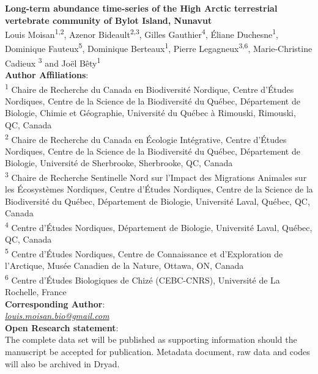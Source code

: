 \documentclass[a4paper,twoside,12pt]{article}
\begin{document}
 
\begingroup  
  \centering
\textbf{Long-term abundance time-series of the High Arctic terrestrial vertebrate community of Bylot Island, Nunavut}\\[1.5em]
 Louis Moisan\textsuperscript{1,2}, Azenor Bideault\textsuperscript{2,3}, Gilles Gauthier\textsuperscript{4}, Éliane Duchesne\textsuperscript{1}, 
 Dominique Fauteux\textsuperscript{5}, Dominique Berteaux\textsuperscript{1}, Pierre Legagneux\textsuperscript{3,6}, Marie-Christine Cadieux \textsuperscript{3} and Joël Bêty\textsuperscript{1}\\[1.5em]
\textbf{Author Affiliations}:\\
\textsuperscript{1} Chaire de Recherche du Canada en Biodiversité Nordique, Centre d’Études Nordiques, Centre de la Science de la Biodiversité du Québec, Département de Biologie, Chimie et Géographie, Université du Québec à Rimouski, Rimouski, QC, Canada\\
\textsuperscript{2} Chaire de Recherche du Canada en Écologie Intégrative, Centre d’Études Nordiques, Centre de la Science de la Biodiversité du Québec, Département de Biologie, Université de Sherbrooke, Sherbrooke, QC, Canada\\
\textsuperscript{3} Chaire de Recherche Sentinelle Nord sur l’Impact des Migrations Animales sur les Écosystèmes Nordiques, Centre d’Études Nordiques, Centre de la Science de la Biodiversité du Québec, Département de Biologie, Université Laval, Québec, QC, Canada\\
\textsuperscript{4} Centre d’Études Nordiques, Département de Biologie, Université Laval, Québec, QC, Canada\\
\textsuperscript{5} Centre d’Études Nordiques, Centre de Connaissance et d’Exploration de l’Arctique, Musée Canadien de la Nature, Ottawa, ON, Canada\\
\textsuperscript{6} Centre d’Études Biologiques de Chizé (CEBC-CNRS), Université de La Rochelle, France 
\\[1.5em]
\textbf{Corresponding Author}:\\
\textit{\href{mailto:louis.moisan.bio@gmail.com}{louis.moisan.bio@gmail.com}}\\
[1.5em]
\textbf{Open Research statement}:\\
The complete data set will be published as supporting information should the manuscript be accepted for publication. Metadata document, raw data and codes will also be archived in Dryad.\\
\endgroup
\newpage
\end{document}
